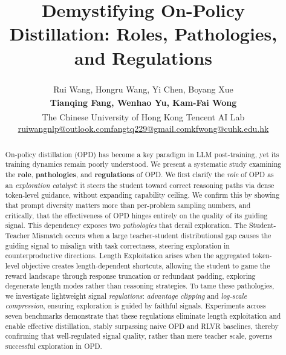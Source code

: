 \documentclass[11pt]{article}
\title{Demystifying On-Policy Distillation: Roles, Pathologies, and Regulations}
\author{
Rui Wang\textsuperscript{\dag},  Hongru Wang\textsuperscript{\dag}, Yi Chen, Boyang Xue\textsuperscript{\dag}\\
\textbf{Tianqing Fang\textsuperscript{\ddag*}, \textbf{Wenhao Yu\textsuperscript{\ddag}}, Kam-Fai Wong\textsuperscript{\dag*}} \\
\textsuperscript{\dag}The Chinese University of Hong Kong 
\textsuperscript{\ddag}Tencent AI Lab\\
\url{ruiwangnlp@outlook.com}\quad \url{fangtq229@gmail.com}\quad \url{kfwong@cuhk.edu.hk}\\
}
\begin{document}
\maketitle
\begin{abstract}

On-policy distillation (OPD) has become a key paradigm in LLM post-training, yet its training dynamics remain poorly understood. 
We present a systematic study examining the \textbf{role}, \textbf{pathologies}, and \textbf{regulations} of OPD. 
We first clarify the {\textit{role}} of OPD as an \textit{exploration catalyst}: it steers the student toward correct reasoning paths via dense token-level guidance, without expanding capability ceiling.
We confirm this by showing that prompt diversity matters more than per-problem sampling numbers, and critically, that the effectiveness of OPD hinges entirely on the quality of its guiding signal. 
This dependency exposes two {\textit{pathologies}} that derail exploration. 
The { Student-Teacher Mismatch} occurs when a large teacher-student distributional gap causes the guiding signal to misalign with task correctness, steering exploration in counterproductive directions. 
{Length Exploitation} arises when the aggregated token-level objective creates length-dependent shortcuts, allowing the student to game the reward landscape through response truncation or redundant padding, exploring degenerate length modes rather than reasoning strategies. 
To tame these pathologies, we investigate lightweight signal {\textit{regulations}}: \textit{advantage clipping} and \textit{log-scale compression}, ensuring exploration is guided by faithful signals. 
Experiments across seven benchmarks demonstrate that these regulations eliminate length exploitation and enable effective distillation, stably surpassing naive OPD and RLVR baselines, thereby confirming that well-regulated signal quality, rather than mere teacher scale, governs successful exploration in OPD. 




\end{abstract}
\end{document}
